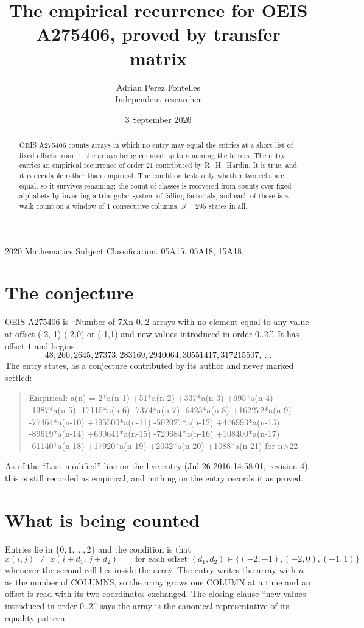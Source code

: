 \documentclass[11pt,a4paper]{article}
\title{The empirical recurrence for OEIS A275406, proved by transfer matrix}
\author{Adrian Perez Fontelles\\ \small Independent researcher}
\date{3 September 2026}
\theoremstyle{plain}
\theoremstyle{definition}
\begin{document}
\maketitle

\begin{abstract}
OEIS A275406 counts arrays in which no entry may equal the entries at a short list of fixed offsets
from it, the arrays being counted up to renaming the letters. The entry carries an empirical
recurrence of order $21$ contributed by R.~H.~Hardin. It is true, and it is decidable
rather than empirical. The condition tests only whether two cells are equal, so it survives
renaming; the count of classes is recovered from counts over fixed alphabets by inverting a
triangular system of falling factorials, and each of those is a walk count on a window of
$1$ consecutive columns, $S=295$ states in all.
\end{abstract}

\noindent\small 2020 Mathematics Subject Classification. 05A15, 05A18, 15A18.\normalsize

\section{The conjecture}

OEIS A275406 is ``Number of 7Xn 0..2 arrays with no element equal to any value at offset (-2,-1) (-2,0) or (-1,1) and new values introduced in order 0..2.''. It has offset $1$ and begins
\[
48, 260, 2645, 27373, 283169, 2940064, 30551417, 317215507,\ \dots
\]
The entry states, as a conjecture contributed by its author and never marked settled:
\begin{quote}
Empirical: a(n) = 2*a(n-1) +51*a(n-2) +337*a(n-3) +695*a(n-4) -1387*a(n-5) -17115*a(n-6) -7374*a(n-7) -6423*a(n-8) +162272*a(n-9) -77464*a(n-10) +195500*a(n-11) -502027*a(n-12) +476993*a(n-13) -89619*a(n-14) +690641*a(n-15) -729684*a(n-16) +108400*a(n-17) -61140*a(n-18) +17920*a(n-19) +2032*a(n-20) +1088*a(n-21) for n>22
\end{quote}
As of the ``Last modified'' line on the live entry (Jul 26 2016 14:58:01, revision 4) this is still
recorded as empirical, and nothing on the entry records it as proved.

\section{What is being counted}

Entries lie in $\{0,1,\dots,2\}$ and the condition is that
\[
x(i,j)\ \ne\ x(i+d_1,\,j+d_2)\qquad\text{for each offset }(d_1,d_2)\in\{(-2,-1), (-2,0), (-1,1)\}
\]
whenever the second cell lies inside the array. The entry writes the array with $n$ as the number of COLUMNS, so the array grows one COLUMN at a time and an offset is read with its two coordinates exchanged. The closing clause ``new values
introduced in order $0..2$'' says the array is the canonical representative of its equality
pattern.
\end{document}
